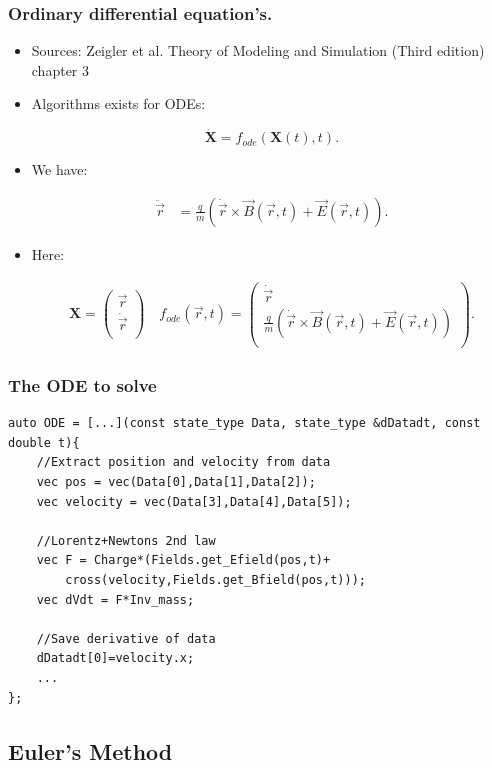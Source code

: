 \documentclass{beamer}
\newcommand{\mvec}[2]{
\ensuremath{\left(
\begin{array}{c}
#1\\
#2\\
\end{array}
\right)}
}
\begin{document}
\begin{frame}
\frametitle{Ordinary differential equation's.}
\begin{itemize}
\item<1-> {\color{gray} Sources: Zeigler et al. Theory of Modeling and Simulation (Third edition) chapter 3}

\item<1-> Algorithms exists for ODEs:

\begin{equation*}
\dot{\mathbf{X}} = f_{ode}(\mathbf{X}(t),t).
\end{equation*}

\item<2-> We have:

\begin{align*}
\ddot{\vec{r}} &= \frac{q}{m} ( \dot{\vec{r}}\times \vec{B}(\vec{r},t)+\vec{E}(\vec{r},t)).
\end{align*}

\item<3-> Here:

\begin{align*}
\mathbf{X} = \mvec{\vec{r}}{\dot{\vec{r}}} \quad f_{ode}(\vec{r},t) = \mvec{\dot{\vec{r}}}{\frac{q}{m} ( \dot{\vec{r}}\times \vec{B}(\vec{r},t)+\vec{E}(\vec{r},t))}.
\end{align*}
\end{itemize}
\end{frame}

\begin{frame}[fragile]
\frametitle{The ODE to solve}
\begin{lstlisting}
auto ODE = [...](const state_type Data, state_type &dDatadt, const double t){
    //Extract position and velocity from data
    vec pos = vec(Data[0],Data[1],Data[2]);
    vec velocity = vec(Data[3],Data[4],Data[5]);

    //Lorentz+Newtons 2nd law
    vec F = Charge*(Fields.get_Efield(pos,t)+
        cross(velocity,Fields.get_Bfield(pos,t)));
    vec dVdt = F*Inv_mass;

    //Save derivative of data
    dDatadt[0]=velocity.x;
    ...
};
\end{lstlisting}
\end{frame}


\subsection{Euler's Method}
\end{document}
